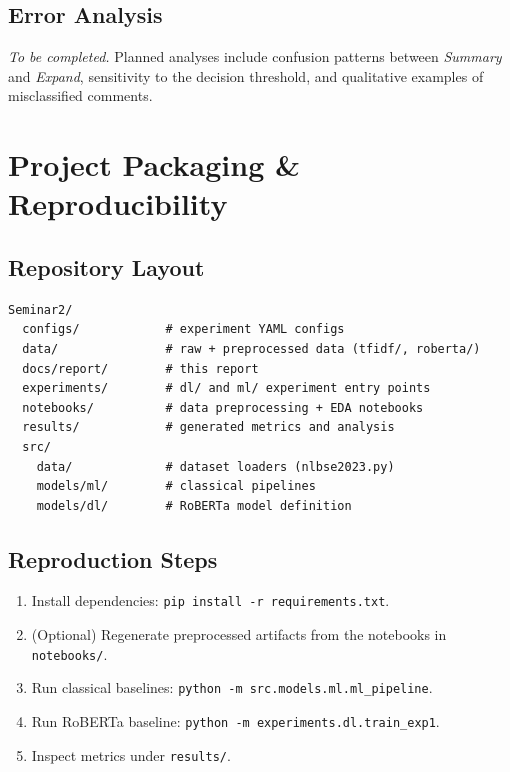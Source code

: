 \documentclass[11pt,a4paper]{article}
\begin{document}
\subsection{Error Analysis}

\textit{To be completed.} Planned analyses include confusion patterns between
\textit{Summary} and \textit{Expand}, sensitivity to the decision threshold, and
qualitative examples of misclassified comments.

\section{Project Packaging \& Reproducibility}
\label{sec:packaging}

\subsection{Repository Layout}

\begin{lstlisting}
Seminar2/
  configs/            # experiment YAML configs
  data/               # raw + preprocessed data (tfidf/, roberta/)
  docs/report/        # this report
  experiments/        # dl/ and ml/ experiment entry points
  notebooks/          # data preprocessing + EDA notebooks
  results/            # generated metrics and analysis
  src/
    data/             # dataset loaders (nlbse2023.py)
    models/ml/        # classical pipelines
    models/dl/        # RoBERTa model definition
\end{lstlisting}

\subsection{Reproduction Steps}

\begin{enumerate}[nosep]
    \item Install dependencies: \texttt{pip install -r requirements.txt}.
    \item (Optional) Regenerate preprocessed artifacts from the notebooks in
          \texttt{notebooks/}.
    \item Run classical baselines:
          \texttt{python -m src.models.ml.ml\_pipeline}.
    \item Run RoBERTa baseline:
          \texttt{python -m experiments.dl.train\_exp1}.
    \item Inspect metrics under \texttt{results/}.
\end{enumerate}
\end{document}
